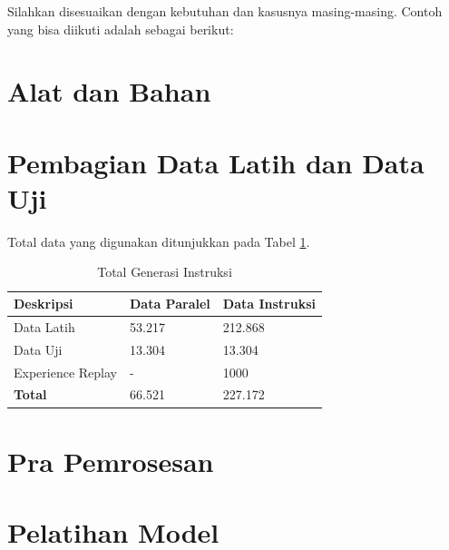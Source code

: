 Silahkan disesuaikan dengan kebutuhan dan kasusnya masing-masing. Contoh yang bisa diikuti adalah sebagai berikut: 

\section{Alat dan Bahan}
    
\section{Pembagian Data Latih dan Data Uji}
Total data yang digunakan ditunjukkan pada Tabel \ref{tab:total_instruksi}. 

\begin{table}[!h]
    \centering
    \caption{Total Generasi Instruksi}
    \label{tab:total_instruksi}
    \begin{tabular}{lll}
    \toprule
        Deskripsi & Data Paralel & Data Instruksi  \\
    \midrule
        Data Latih  & 53.217 & 212.868 \\
        Data Uji & 13.304 & 13.304 \\
        Experience Replay & - & 1000 \\
    \midrule
        \textbf{Total} & 66.521 & 227.172 \\
    \bottomrule
    \end{tabular}
\end{table}

\section{Pra Pemrosesan}




\section{Pelatihan Model}
